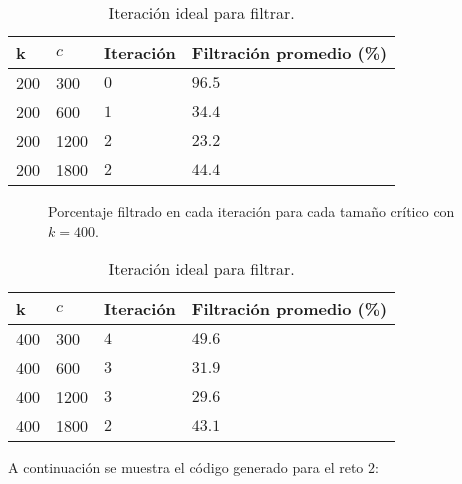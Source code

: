 \documentclass{article}
\begin{document}
\begin{table}[h!]
\centering
\caption{Iteración ideal para filtrar.}
\smallskip

\begin{tabular}{ |p{1cm}|p{1.5cm}|p{2cm}|p{3.8cm}|}
 \hline
 k & $c$ & Iteración & Filtración promedio (\%) \\
 \hline
 200 & 300 &  $0$ & $96.5$ \\
 \hline
 200 & 600 & $1$ & $34.4$\\
 \hline
 200 & 1200 & $2$ & $23.2$\\
 \hline
 200 & 1800 & $2$ & $44.4$\\
 \hline
\end{tabular}
\label{Cuadro4}
\end{table}

\newpage

\begin{figure}[h!]
\centering
{}
\caption{Porcentaje filtrado en cada iteración para cada tamaño crítico con $k = 400$.} 
\label{f5}
\end{figure}

\begin{table}[h!]
\centering
\caption{Iteración ideal para filtrar.}
\smallskip

\begin{tabular}{ |p{1cm}|p{1.5cm}|p{2cm}|p{3.8cm}|}
 \hline
 k & $c$ & Iteración & Filtración promedio (\%) \\
 \hline
 400 & 300 & $4$ & $49.6$ \\
 \hline
 400 & 600 & $3$ & $31.9$\\
 \hline
 400 & 1200 & $3$ & $29.6$\\
 \hline
 400 & 1800 & $2$ & $43.1$\\
 \hline
\end{tabular}
\label{Cuadro5}
\end{table}

A continuación se muestra el código generado para el reto $2$:

\end{document}
